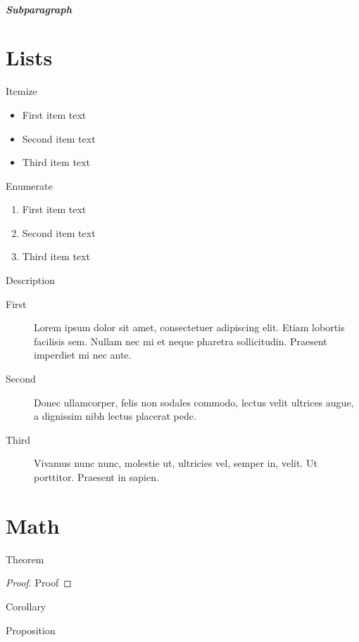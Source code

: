 \documentclass[english,counters by chapter]{uniud}
\begin{document}
\blindtext

\subparagraph{Subparagraph}

\blindtext

\section{Lists}


Itemize
\begin{itemize}
\item First item text
\item Second item text
\item Third item text
\end{itemize}
Enumerate
\begin{enumerate}
\item First item text
\item Second item text
\item Third item text
\end{enumerate}
Description
\begin{description}
\item[First] 
	Lorem ipsum dolor sit amet, consectetuer adipiscing elit. Etiam lobortis facilisis sem. Nullam nec mi et neque pharetra sollicitudin. Praesent imperdiet mi nec ante.
\item[Second] 
	 Donec ullamcorper, felis non sodales commodo, lectus velit ultrices augue, a dignissim nibh lectus placerat pede.
\item[Third] 
	Vivamus nunc nunc, molestie ut, ultricies vel, semper in, velit. Ut porttitor. Praesent in sapien.
\end{description}


\section{Math}

\begin{theorem}
	\label{thm:first}
	Theorem
\end{theorem}
\begin{proof}
	Proof
\end{proof}

\begin{corollary}
	\label{cor:first}
	Corollary
\end{corollary}

\begin{proposition}
	\label{prop:first}
	Proposition
\end{proposition}
\end{document}

